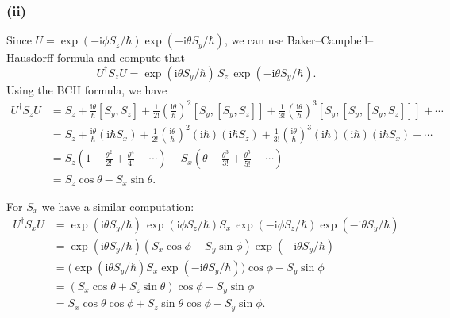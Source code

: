 \documentclass{article}
\newcommand{\ii}{\mathrm{i}}
\begin{document}
\subsubsection*{(ii)}
Since $U=\exp(-\ii \phi S_z/\hbar)\exp(-\ii \theta S_y/\hbar)$, we can use Baker–Campbell–Hausdorff formula and compute that
\begin{equation}
    U^\dagger S_z U=\exp(\ii \theta S_y/\hbar)\,S_z\,\exp(-\ii \theta S_y/\hbar).
\end{equation}
Using the BCH formula, we have
\begin{equation}
    \begin{split}
        U^\dagger S_z U&= S_z +\frac{\ii \theta}{\hbar}[S_y,S_z] +\frac{1}{2!}\left(\frac{\ii \theta}{\hbar}\right)^2 [S_y,[S_y,S_z]] +\frac{1}{3!}\left(\frac{\ii \theta}{\hbar}\right)^3 [S_y,[S_y,[S_y,S_z]]]+\cdots\\
                       &= S_z +\frac{\ii \theta}{\hbar}(\ii \hbar S_x) +\frac{1}{2!}\left(\frac{\ii \theta}{\hbar}\right)^2 (\ii \hbar)(\ii \hbar S_z) +\frac{1}{3!}\left(\frac{\ii \theta}{\hbar}\right)^3 (\ii \hbar)(\ii \hbar)(\ii \hbar S_x)+\cdots\\
                       &= S_z \left(1 -\frac{\theta^2}{2!} +\frac{\theta^4}{4!} -\cdots\right) - S_x \left(\theta -\frac{\theta^3}{3!} +\frac{\theta^5}{5!} -\cdots\right)\\
                          &= S_z \cos\theta - S_x \sin\theta.
    \end{split}
\end{equation}


For $S_x$ we have a similar computation:
\begin{equation}
    \begin{split}
        U^\dagger S_x U&=\exp(\ii \theta S_y/\hbar)\, \exp(\ii \phi S_z/\hbar) S_x\,\exp(-\ii \phi S_z/\hbar)\exp(-\ii \theta S_y/\hbar)\\
                          &=\exp(\ii \theta S_y/\hbar) \left(S_x \cos\phi - S_y \sin\phi\right) \exp(-\ii \theta S_y/\hbar)\\
                            &= \big(\exp(\ii \theta S_y/\hbar) S_x \exp(-\ii \theta S_y/\hbar)\big)\cos\phi - S_y\sin\phi\\
                            &= \left(S_x\cos\theta + S_z\sin\theta\right)\cos\phi - S_y\sin\phi\\
                            &= S_x\cos\theta\cos\phi + S_z\sin\theta\cos\phi - S_y\sin\phi.
    \end{split}
\end{equation}
\end{document}
